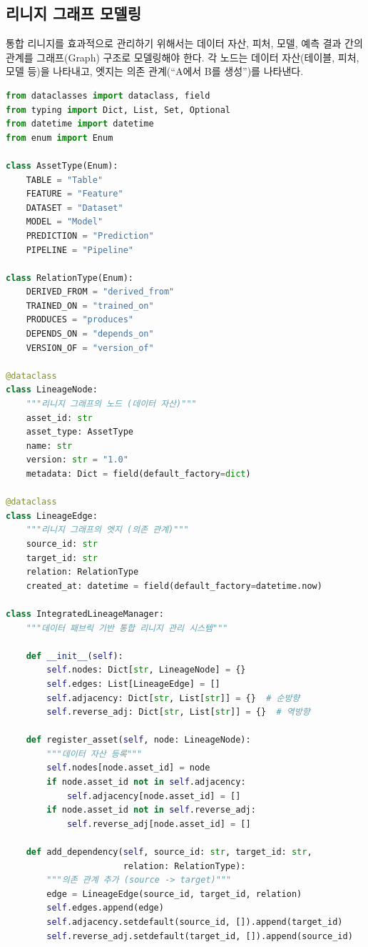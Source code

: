 \subsection{리니지 그래프 모델링}
\label{sec:9.2.2}

통합 리니지를 효과적으로 관리하기 위해서는 데이터 자산, 피처, 모델, 예측 결과 간의 관계를 그래프(Graph) 구조로 모델링해야 한다. 각 노드는 데이터 자산(테이블, 피처, 모델 등)을 나타내고, 엣지는 의존 관계(``A에서 B를 생성'')를 나타낸다.

\begin{lstlisting}[language=Python, caption={통합 리니지 관리 시스템}, label={lst:integrated_lineage}]
from dataclasses import dataclass, field
from typing import Dict, List, Set, Optional
from datetime import datetime
from enum import Enum

class AssetType(Enum):
    TABLE = "Table"
    FEATURE = "Feature"
    DATASET = "Dataset"
    MODEL = "Model"
    PREDICTION = "Prediction"
    PIPELINE = "Pipeline"

class RelationType(Enum):
    DERIVED_FROM = "derived_from"
    TRAINED_ON = "trained_on"
    PRODUCES = "produces"
    DEPENDS_ON = "depends_on"
    VERSION_OF = "version_of"

@dataclass
class LineageNode:
    """리니지 그래프의 노드 (데이터 자산)"""
    asset_id: str
    asset_type: AssetType
    name: str
    version: str = "1.0"
    metadata: Dict = field(default_factory=dict)

@dataclass
class LineageEdge:
    """리니지 그래프의 엣지 (의존 관계)"""
    source_id: str
    target_id: str
    relation: RelationType
    created_at: datetime = field(default_factory=datetime.now)

class IntegratedLineageManager:
    """데이터 패브릭 기반 통합 리니지 관리 시스템"""

    def __init__(self):
        self.nodes: Dict[str, LineageNode] = {}
        self.edges: List[LineageEdge] = []
        self.adjacency: Dict[str, List[str]] = {}  # 순방향
        self.reverse_adj: Dict[str, List[str]] = {}  # 역방향

    def register_asset(self, node: LineageNode):
        """데이터 자산 등록"""
        self.nodes[node.asset_id] = node
        if node.asset_id not in self.adjacency:
            self.adjacency[node.asset_id] = []
        if node.asset_id not in self.reverse_adj:
            self.reverse_adj[node.asset_id] = []

    def add_dependency(self, source_id: str, target_id: str,
                       relation: RelationType):
        """의존 관계 추가 (source -> target)"""
        edge = LineageEdge(source_id, target_id, relation)
        self.edges.append(edge)
        self.adjacency.setdefault(source_id, []).append(target_id)
        self.reverse_adj.setdefault(target_id, []).append(source_id)


\end{lstlisting}
